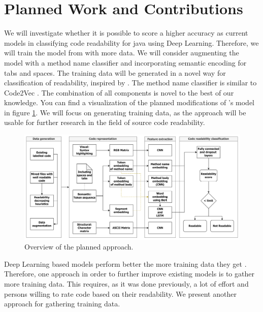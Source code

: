 \documentclass[%
class=scrreprt,
chapterprefix=false,%
open=right,%
twoside=false,%
paper=a4,%
logofile={Logo\_zentral\_farbig\_EN.png},%
thesistype=masterproposal,%
UKenglish,%
]{se2thesis}
\begin{document}
	\section{Planned Work and Contributions} \label{Planned Work and Contributions}
	We will investigate whether it is possible to score a higher accuracy as current models in classifying code readability for java using Deep Learning. Therefore, we will train the model from \citeauthor{mi2022towards} \cite{mi2022towards} with more data. We will consider augmenting the model with a method name classifier and incorporating semantic encoding for tabs and spaces. The training data will be generated in a novel way for classification of readability, inspired by \citeauthor{loriot2022styler} \cite{loriot2022styler}. The method name classifier is similar to Code2Vec \cite{alon2019code2vec}. The combination of all components is novel to the best of our knowledge. You can find a visualization of the planned modifications of \citeauthor{mi2022towards}'s model in figure \ref{fig:model_pipeline}. We will focus on generating training data, as the approach will be usable for further research in the field of source code readability.\\
	
	\begin{figure}[t]
		\centering
		\includegraphics[width=\textwidth]{Model_pipeline.png}
		\caption{Overview of the planned approach.}
		\label{fig:model_pipeline}
	\end{figure}
	
	Deep Learning based models perform better the more training data they get \cite{hestness2017deep}. Therefore, one approach in order to further improve existing models is to gather more training data.
	This requires, as it was done previously, a lot of effort and persons willing to rate code based on their readability. We present another approach for gathering training data.
	
\end{document}
